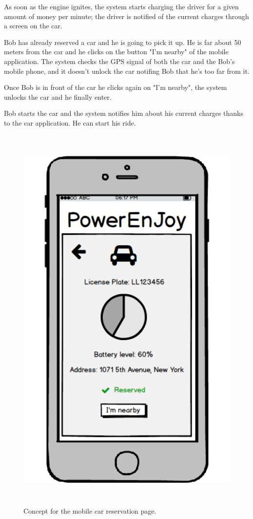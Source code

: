 As soon as the engine ignites, the system starts charging the driver for a given amount of money per minute; the driver is notified of the current charges through a screen on the car.

Bob has already reserved a car and he is going to pick it up. He is far about 50 meters from the car and he clicks on the button "I'm nearby" of the mobile application. The system checks the GPS signal of both the car and the Bob's mobile phone, and it doesn't unlock the car notifing Bob that he's too far from it.

Once Bob is in front of the car he clicks again on "I'm nearby", the system unlocks the car and he finally enter.

Bob starts the car and the system notifies him about his current charges thanks to the car application. He can start his ride.

\begin{figure}[H]
	\centering
	\includegraphics[height=20cm]{mockup/MobileUnlock.png}
	\caption{Concept for the mobile car reservation page.}
\end{figure}

